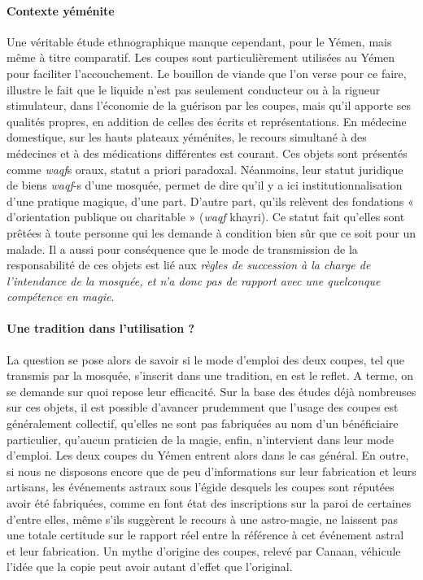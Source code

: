 \paragraph{Contexte yéménite}
Une véritable étude ethnographique manque cependant, pour le Yémen, mais même à titre comparatif. Les coupes sont particulièrement utilisées au Yémen pour faciliter l'accouchement. Le bouillon de viande que l'on verse pour ce faire, illustre le fait que le liquide n'est pas seulement conducteur ou à la rigueur stimulateur, dans l'économie de la guérison par les coupes, mais qu'il apporte ses qualités propres, en addition de celles des écrits et représentations. En médecine domestique, sur les hauts plateaux yéménites, le recours simultané à des médecines et à des médications différentes est courant. Ces objets sont présentés comme \textit{waqf}s oraux, statut a priori paradoxal. Néanmoins, leur statut juridique de biens \textit{waqf}-s d'une mosquée, permet de dire qu'il y a ici institutionnalisation d'une pratique magique, d'une part. D'autre part, qu'ils relèvent des fondations « d'orientation publique ou charitable » (\textit{waqf} khayri). Ce statut fait qu'elles sont prêtées à toute personne qui les demande à condition bien sûr que ce soit pour un malade. Il a aussi pour conséquence que le mode de transmission de la responsabilité de ces objets est lié aux \textit{règles de succession à la charge de l'intendance de la mosquée, et n'a donc pas de rapport avec une quelconque compétence en magie}. 
\paragraph{Une tradition dans l'utilisation ?}
La question se pose alors de savoir si le mode d'emploi des deux coupes, tel que transmis par la mosquée, s'inscrit dans une tradition, en est le reflet. A terme, on se demande sur quoi repose leur efficacité. Sur la base des études déjà nombreuses sur ces objets, il est possible d'avancer prudemment que l'usage des coupes est généralement collectif, qu'elles ne sont pas fabriquées au nom d'un bénéficiaire particulier, qu'aucun praticien de la magie, enfin, n'intervient dans leur mode d'emploi. Les deux coupes du Yémen entrent alors dans le cas général. En outre, si nous ne disposons encore que de peu d'informations sur leur fabrication et leurs artisans, les événements astraux sous l'égide desquels les coupes sont réputées avoir été fabriquées, comme en font état des inscriptions sur la paroi de certaines d'entre elles, même s'ils suggèrent le recours à une astro-magie, ne laissent pas une totale certitude sur le rapport réel entre la référence à cet événement astral et leur fabrication. Un mythe d'origine des coupes, relevé par Canaan, véhicule l'idée que la copie peut avoir autant d'effet que l'original. 
